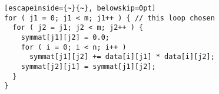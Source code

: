 \begin{lstlisting}[escapeinside={~}{~}, belowskip=0pt]
for ( j1 = 0; j1 < m; j1++ ) { // this loop chosen
  for ( j2 = j1; j2 < m; j2++ ) {
    symmat[j1][j2] = 0.0;
    for ( i = 0; i < n; i++ )
      symmat[j1][j2] += data[i][j1] * data[i][j2];
    symmat[j2][j1] = symmat[j1][j2];
  }
}
\end{lstlisting}
